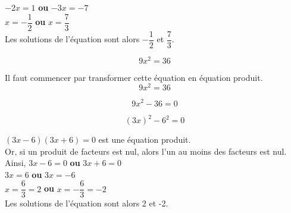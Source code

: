 \documentclass[a4paper,10pt,twoside,french]{article}
\begin{document}
\hspace*{1.6cm} $-2x= 1$ \hspace*{1.5cm} \textbf{ou} \hspace*{1cm}$-3x = -7$\\

\hspace*{1.6cm} $x= -\dfrac{1}{2}$ \hspace*{1.5cm} \textbf{ou} \hspace*{1cm}$x = \dfrac{7}{3}$\\


Les solutions de l'équation sont alors $-\dfrac{1}{2}$ et $ \dfrac{7}{3}$.\\
 
 
\color{black}

 
$$9x^{2} = 36$$

 \color{red}
 
Il faut commencer par transformer cette équation en équation produit.\\

$$9x^{2} = 36$$

$$9x^{2} - 36=0$$


$$(3x)^{2} - 6^{2}=0$$

$(3x - 6) (3x + 6)=0$ est une équation produit.\\

Or, si un produit de facteurs est nul, alors l'un au moins des facteurs est nul.\\

Ainsi, \hspace*{0.6cm} $3x-6 = 0$ \hspace*{1cm} \textbf{ou} \hspace*{1cm}$3x+6 = 0$\\

\hspace*{1.6cm} $3x= 6$ \hspace*{1.5cm} \textbf{ou} \hspace*{1cm}$3x = -6$\\

\hspace*{1.6cm} $x=\dfrac{6}{3}=2$ \hspace*{1.5cm} \textbf{ou} \hspace*{1cm}$x = -\dfrac{6}{3}=-2$\\


Les solutions de l'équation sont alors 2 et -2.\\

\color{black}
\end{document}
